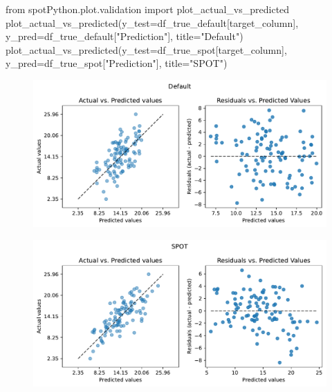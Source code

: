\documentclass[
  letterpaper,
  DIV=11,
  numbers=noendperiod]{scrreprt}
\newenvironment{Shaded}{\begin{snugshade}}{\end{snugshade}}
\newcommand{\ImportTok}[1]{\textcolor[rgb]{0.00,0.46,0.62}{#1}}
\newcommand{\NormalTok}[1]{\textcolor[rgb]{0.00,0.23,0.31}{#1}}
\newcommand{\OperatorTok}[1]{\textcolor[rgb]{0.37,0.37,0.37}{#1}}
\newcommand{\StringTok}[1]{\textcolor[rgb]{0.13,0.47,0.30}{#1}}
\begin{document}
\begin{Shaded}
\begin{Highlighting}[]
\ImportTok{from}\NormalTok{ spotPython.plot.validation }\ImportTok{import}\NormalTok{ plot\_actual\_vs\_predicted}
\NormalTok{plot\_actual\_vs\_predicted(y\_test}\OperatorTok{=}\NormalTok{df\_true\_default[target\_column], y\_pred}\OperatorTok{=}\NormalTok{df\_true\_default[}\StringTok{"Prediction"}\NormalTok{], title}\OperatorTok{=}\StringTok{"Default"}\NormalTok{)}
\NormalTok{plot\_actual\_vs\_predicted(y\_test}\OperatorTok{=}\NormalTok{df\_true\_spot[target\_column], y\_pred}\OperatorTok{=}\NormalTok{df\_true\_spot[}\StringTok{"Prediction"}\NormalTok{], title}\OperatorTok{=}\StringTok{"SPOT"}\NormalTok{)}
\end{Highlighting}
\end{Shaded}

\begin{figure}[H]

{\centering \includegraphics{024_spot_hpt_river_friedman_hatr_files/figure-pdf/cell-36-output-1.pdf}

}

\end{figure}

\begin{figure}[H]

{\centering \includegraphics{024_spot_hpt_river_friedman_hatr_files/figure-pdf/cell-36-output-2.pdf}

}

\end{figure}
\end{document}

